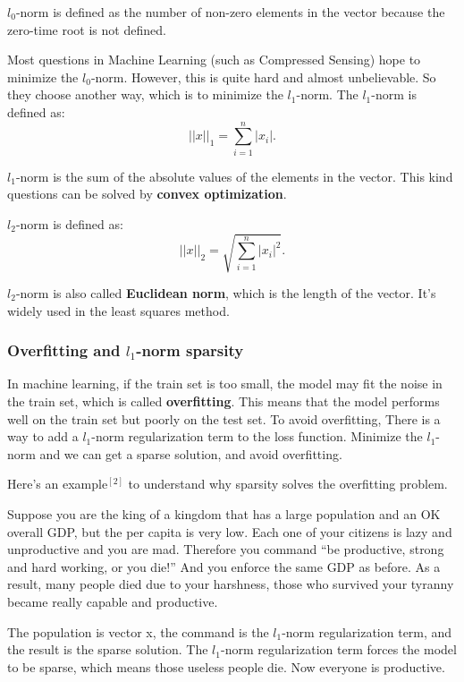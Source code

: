 \documentclass[12pt]{ctexart}
\newenvironment{mdquote}
{%
  \par\noindent
  \begin{list}{}{%
      \setlength{\leftmargin}{1em}%
      \setlength{\rightmargin}{0pt}%
      \setlength{\itemindent}{0pt}%
      \setlength{\listparindent}{\parindent}%
      \setlength{\topsep}{0.5\baselineskip}%
  }
  \item[\textbf{>}\ ]\itshape
}
{\end{list}\par}
\begin{document}
$l_0$-norm is defined as the number of non-zero elements in the vector because the zero-time
root is not defined.

Most questions in Machine Learning (such as Compressed Sensing) hope to minimize the
$l_0$-norm. However, this is quite hard and almost unbelievable. So they choose another
way, which is to minimize the $l_1$-norm. The $l_1$-norm is defined as:
\[
  ||x||_1 = \sum_{i=1}^{n} |x_i|.
\]

$l_1$-norm is the sum of the absolute values of the elements in the vector. This kind
questions can be solved by \textbf{convex optimization}.

$l_2$-norm is defined as:
\[
  ||x||_2 = \sqrt{\sum_{i=1}^{n} |x_i|^2}.
\]

$l_2$-norm is also called \textbf{Euclidean norm}, which is the length of the vector.
It's widely used in the least squares method.

\subsubsection{\textbf{Overfitting and $l_1$-norm sparsity}}

In machine learning, if the train set is too small, the model may fit the noise
in the train set, which is called \textbf{overfitting}. This means that the model
performs well on the train set but poorly on the test set. To avoid overfitting,
There is a way to add a $l_1$-norm regularization term to the loss function. Minimize
the $l_1$-norm and we can get a sparse solution, and avoid overfitting.

Here's an example$^{[2]}$ to understand why sparsity solves the overfitting problem.

\begin{mdquote}
Suppose you are the king of a kingdom that has a large population and an OK overall GDP,
but the per capita is very low. Each one of your citizens is lazy and unproductive and
you are mad. Therefore you command “be productive, strong and hard working, or you die!”
And you enforce the same GDP as before. As a result, many people died due to your harshness,
those who survived your tyranny became really capable and productive.
\end{mdquote}

The population is vector x, the command is the $l_1$-norm regularization term, and the
result is the sparse solution. The $l_1$-norm regularization term forces the model to
be sparse, which means those useless people die. Now everyone is productive.
\end{document}
